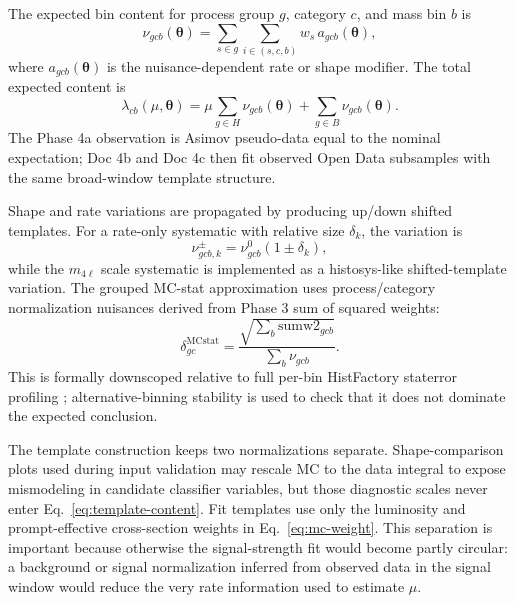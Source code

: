 \documentclass[11pt]{article}
\begin{document}
The expected bin content for process group $g$, category $c$, and mass bin $b$ is
\begin{equation}
 \nu_{gcb}(\boldsymbol{\theta}) = \sum_{s\in g}\sum_{i\in(s,c,b)} w_s\,a_{gcb}(\boldsymbol{\theta}),
 \label{eq:template-content}
\end{equation}
where $a_{gcb}(\boldsymbol{\theta})$ is the nuisance-dependent rate or shape modifier. The total expected content is
\begin{equation}
 \lambda_{cb}(\mu,\boldsymbol{\theta}) = \mu\sum_{g\in H}\nu_{gcb}(\boldsymbol{\theta}) + \sum_{g\in B}\nu_{gcb}(\boldsymbol{\theta}).
 \label{eq:expected-content}
\end{equation}
The Phase 4a observation is Asimov pseudo-data equal to the nominal expectation; Doc 4b and Doc 4c then fit observed Open Data subsamples with the same broad-window template structure.

Shape and rate variations are propagated by producing up/down shifted templates. For a rate-only systematic with relative size $\delta_k$, the variation is
\begin{equation}
 \nu^{\pm}_{gcb,k}=\nu^{0}_{gcb}(1\pm\delta_k),
 \label{eq:rate-syst}
\end{equation}
while the $m_{4\ell}$ scale systematic is implemented as a histosys-like shifted-template variation. The grouped MC-stat approximation uses process/category normalization nuisances derived from Phase 3 sum of squared weights:
\begin{equation}
 \delta^{\mathrm{MCstat}}_{gc}=\frac{\sqrt{\sum_b \mathrm{sumw2}_{gcb}}}{\sum_b \nu_{gcb}}.
 \label{eq:mcstat-grouped}
\end{equation}
This is formally downscoped relative to full per-bin HistFactory staterror profiling \cite{HistFactory}; alternative-binning stability is used to check that it does not dominate the expected conclusion.

The template construction keeps two normalizations separate. Shape-comparison plots used during input validation may rescale MC to the data integral to expose mismodeling in candidate classifier variables, but those diagnostic scales never enter Eq.~\ref{eq:template-content}. Fit templates use only the luminosity and prompt-effective cross-section weights in Eq.~\ref{eq:mc-weight}. This separation is important because otherwise the signal-strength fit would become partly circular: a background or signal normalization inferred from observed data in the signal window would reduce the very rate information used to estimate $\mu$.
\end{document}
